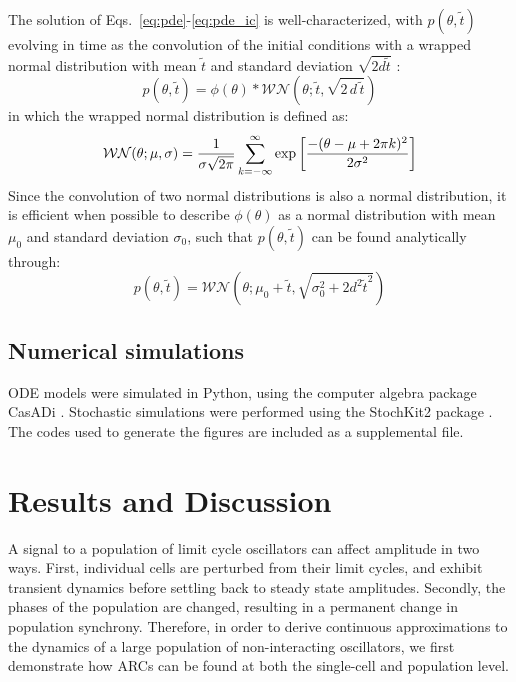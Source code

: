 \documentclass[11pt, letterpaper]{article}
\begin{document}
The solution of Eqs.~\ref{eq:pde}-\ref{eq:pde_ic} is well-characterized, with $p(\theta, \tilde{t})$ evolving in time as the convolution of the initial conditions with a wrapped normal distribution with mean $\tilde{t}$ and standard deviation $\sqrt{2d\tilde{t}}$ \cite{Chirikjian2009}:
\begin{equation}
  p(\theta, \tilde{t}) = \phi(\theta) * \mathcal{WN}(\theta; \tilde{t},
  \sqrt{2\, d\, \tilde{t}})
\end{equation}
in which the wrapped normal distribution \cite{Mardia2009} is defined as:
\begin{equation}
  {\cal WN}(\theta; \mu, \sigma) =
  \frac{1}{\sigma\sqrt{2\pi}}\sum_{k=-\infty}^\infty \exp\left[\frac{-(\theta
  - \mu + 2\pi k)^2}{2\sigma^2}\right]
  \label{eq:wrapped_normal}
\end{equation}
Since the convolution of two normal distributions is also a normal distribution, it is efficient when possible to describe $\phi(\theta)$ as a normal distribution with mean $\mu_0$ and standard deviation $\sigma_0$, such that $p(\theta, \tilde{t})$ can be found analytically through:
\begin{equation}
  p(\theta, \tilde{t}) = \mathcal{WN}(\theta; \mu_0 + \tilde{t},
  \sqrt{\sigma_0^2 + 2d^2\tilde{t}^2})
\end{equation}


\subsection*{Numerical simulations}

ODE models were simulated in Python, using the computer algebra package CasADi \cite{Andersson2013b}.
Stochastic simulations were performed using the StochKit2 package \cite{Sanft2011a}.
The codes used to generate the figures are included as a supplemental file.

\section*{Results and Discussion}

A signal to a population of limit cycle oscillators can affect amplitude in two ways.
First, individual cells are perturbed from their limit cycles, and exhibit transient dynamics before settling back to steady state amplitudes.
Secondly, the phases of the population are changed, resulting in a permanent change in population synchrony.
Therefore, in order to derive continuous approximations to the dynamics of a large population of non-interacting oscillators, we first demonstrate how ARCs can be found at both the single-cell and population level.
\end{document}
